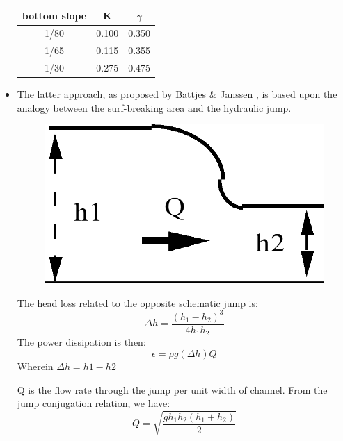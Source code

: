 \begin{itemize}
    \begin{tabular}{|c|c|c|}
      \hline
      bottom slope & K & $\gamma$ \\ \hline
      1/80 & 0.100 & 0.350 \\ \hline
      1/65 & 0.115 & 0.355 \\ \hline
      1/30 & 0.275 & 0.475 \\ \hline
    \end{tabular}

\item  The latter approach, as proposed by Battjes \& Janssen
  \cite{Battjes1978}, is based upon the analogy between the surf-breaking area
    and the hydraulic jump.

    \begin{minipage}[b]{0.4\textwidth}
      \begin{figure}[H]%
        \centering
        \includegraphics[width=\textwidth]{./graphics/jump}
      \end{figure}
    \end{minipage}%
    \begin{minipage}[b]{0.4\textwidth}
The head loss related to the opposite schematic jump is:
    \begin{equation}
      \Delta h = \frac{(h_{1}-h_{2})^{3}}{4h_{1}h_{2}}
      \label{eq:3.42}
    \end{equation}
The power dissipation is then:
\[ \epsilon = \rho g(\Delta h)Q  \]
Wherein $\Delta{h}=h1-h2$ \\
\end{minipage}

Q is the flow rate through the jump per unit width of channel. From the jump
conjugation relation, we have:
\begin{equation}
  Q = \sqrt{\frac{gh_{1}h_{2}(h_{1}+h_{2})}{2}}
  \label{eq:3.43}
\end{equation}


\end{itemize}

